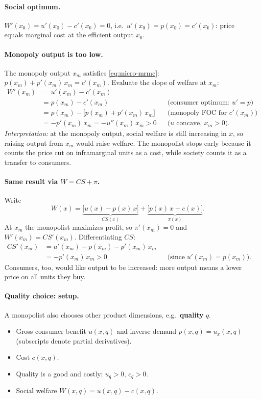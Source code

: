 \paragraph{Social optimum.} $W'(x_0)=u'(x_0)-c'(x_0)=0$, i.e.\ $u'(x_0)=p(x_0)=c'(x_0)$: price equals marginal cost at the efficient output $x_0$.

\paragraph{Monopoly output is too low.} The monopoly output $x_m$ satisfies \eqref{eq:micro-mrmc}: $p(x_m)+p'(x_m)\,x_m=c'(x_m)$. Evaluate the slope of welfare at $x_m$:
\begin{align*}
W'(x_m)&=u'(x_m)-c'(x_m)\\
&=p(x_m)-c'(x_m) &&\text{(consumer optimum: $u'=p$)}\\
&=p(x_m)-\big[p(x_m)+p'(x_m)\,x_m\big] &&\text{(monopoly FOC for $c'(x_m)$)}\\
&=-p'(x_m)\,x_m=-u''(x_m)\,x_m>0 &&\text{($u$ concave, $x_m>0$).}
\end{align*}
\emph{Interpretation:} at the monopoly output, social welfare is still increasing in $x$, so raising output from $x_m$ would raise welfare. The monopolist stops early because it counts the price cut on inframarginal units as a cost, while society counts it as a transfer to consumers.

\paragraph{Same result via $W=CS+\pi$.} Write
\[
W(x)=\underbrace{\big[u(x)-p(x)\,x\big]}_{CS(x)}+\underbrace{\big[p(x)\,x-c(x)\big]}_{\pi(x)} .
\]
At $x_m$ the monopolist maximizes profit, so $\pi'(x_m)=0$ and $W'(x_m)=CS'(x_m)$. Differentiating $CS$:
\begin{align*}
CS'(x_m)&=u'(x_m)-p(x_m)-p'(x_m)\,x_m\\
&=-p'(x_m)\,x_m>0 &&\text{(since $u'(x_m)=p(x_m)$).}
\end{align*}
Consumers, too, would like output to be increased: more output means a lower price on all units they buy.

\paragraph{Quality choice: setup.} A monopolist also chooses other product dimensions, e.g.\ \textbf{quality} $q$.
\begin{itemize}
\item Gross consumer benefit $u(x,q)$ and inverse demand $p(x,q)=u_x(x,q)$ (subscripts denote partial derivatives).
\item Cost $c(x,q)$.
\item Quality is a good and costly: $u_q>0$, $c_q>0$.
\item Social welfare $W(x,q)=u(x,q)-c(x,q)$.
\end{itemize}

